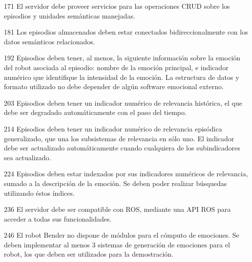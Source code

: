 \begin{requisito-sistema}{17}{1}
	El servidor debe proveer servicios para las operaciones CRUD sobre los episodios y unidades semánticas manejadas.	
\end{requisito-sistema}

\begin{requisito-sistema}{18}{1}
	Los episodios almacenados deben estar conectados bidireccionalmente con los datos semánticos relacionados.	
\end{requisito-sistema}

\begin{requisito-sistema}{19}{2}
	Episodios deben tener, al menos, la siguiente información sobre la emoción del robot asociada al episodio: nombre de la emoción principal, e indicador numérico que identifique la intensidad de la emoción. La estructura de datos y formato utilizado no debe depender de algún software emocional externo.
\end{requisito-sistema}

\begin{requisito-sistema}{20}{3}
	Episodios deben tener un indicador numérico de relevancia histórica, el que debe ser degradado automáticamente con el paso del tiempo.	
\end{requisito-sistema}

\begin{requisito-sistema}{21}{4}
	Episodios deben tener un indicador numérico de relevancia episódica generalizado, que una los subsistemas de relevancia en sólo uno. El indicador debe ser actualizado automáticamente cuando cualquiera de los subindicadores sea actualizado.
\end{requisito-sistema}

\begin{requisito-sistema}{22}{4}
	Episodios deben estar indexados por sus indicadores numéricos de relevancia, sumado a la descripción de la emoción. Se deben poder realizar búsquedas utilizando éstos índices.
\end{requisito-sistema}

\begin{requisito-sistema}{23}{6}
	El servidor debe ser compatible con ROS, mediante una API ROS para acceder a todas sus funcionalidades.	
\end{requisito-sistema}

\begin{requisito-sistema}{24}{6}
	El robot Bender no dispone de módulos para el cómputo de emociones. Se deben implementar al menos 3 sistemas de generación de emociones para el robot, los que deben ser utilizados para la demostración.	
\end{requisito-sistema}

